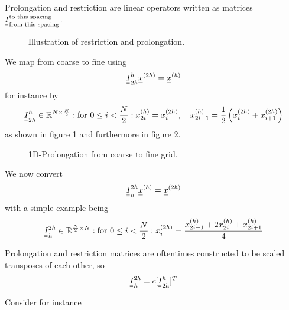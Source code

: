 Prolongation and restriction are linear operators written as matrices $\mat{I}_{\text{from this spacing}}^{\text{to this spacing}}$.

\begin{figure}[H]
    \centering
    
    \caption{Illustration of restriction and prolongation.}
    \label{fig:pro_res_ill}
\end{figure}

We map from coarse to fine using
\begin{equation}
    \mat{I}_{2h}^h \vec{x}^{(2h)} = \vec{x}^{(h)}
\end{equation}
for instance by
\begin{equation}
    \mat{I}_{2h}^h \in \mathbb{R}^{N \times \frac{N}{2}}: \text{for } 0 \leq i < \frac{N}{2}: x_{2i}^{(h)} = x_i^{(2h)}, \quad x_{2i+1}^{(h)} = \frac{1}{2} \left( x_i^{(2h)} + x_{i+1}^{(2h)} \right)
\end{equation}
as shown in figure \ref{fig:pro_res_ill} and furthermore in figure \ref{fig:prolongation}.

\begin{figure}[H]
    \centering
    
    \caption{1D-Prolongation from coarse to fine grid.}
    \label{fig:prolongation}
\end{figure}

We now convert
\begin{equation}
    \mat{I}_{h}^{2h} \vec{x}^{(h)} = \vec{x}^{(2h)}
\end{equation}
with a simple example being
\begin{equation}
    \mat{I}_{h}^{2h} \in \mathbb{R}^{\frac{N}{2} \times N}: \text{for } 0 \leq i < \frac{N}{2}: x_i^{(2h)} = \frac{x_{2i-1}^{(h)} + 2x_{2i}^{(h)} + x_{2i+1}^{(h)}}{4}
\end{equation}

Prolongation and restriction matrices are oftentimes constructed to be
scaled transposes of each other, so
\begin{equation}
    \mat{I}_h^{2h} = c[\mat{I}_{2h}^{h}]^T
\end{equation}

Consider for instance

